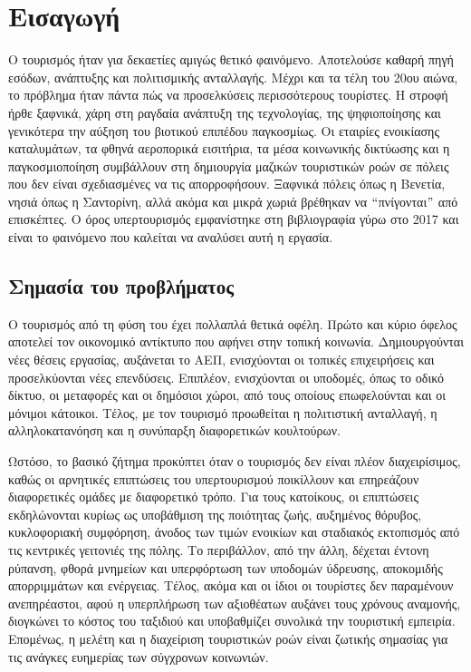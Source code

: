 \chapter{Εισαγωγή}

Ο τουρισμός ήταν για δεκαετίες αμιγώς θετικό φαινόμενο. Αποτελούσε
καθαρή πηγή εσόδων, ανάπτυξης και πολιτισμικής ανταλλαγής. Μέχρι
και τα τέλη του 20ου αιώνα, το πρόβλημα ήταν πάντα πώς να
προσελκύσεις περισσότερους τουρίστες. Η στροφή ήρθε ξαφνικά, χάρη
στη ραγδαία ανάπτυξη της τεχνολογίας, της ψηφιοποίησης και
γενικότερα την αύξηση του βιοτικού επιπέδου παγκοσμίως. Οι
εταιρίες ενοικίασης καταλυμάτων, τα φθηνά αεροπορικά εισιτήρια,
τα μέσα κοινωνικής δικτύωσης και η παγκοσμιοποίηση συμβάλλουν στη
δημιουργία μαζικών τουριστικών ροών σε πόλεις που δεν είναι
σχεδιασμένες να τις απορροφήσουν. Ξαφνικά πόλεις όπως η Βενετία,
νησιά όπως η Σαντορίνη, αλλά ακόμα και μικρά χωριά βρέθηκαν να
$``$πνίγονται$"$ από επισκέπτες. Ο όρος υπερτουρισμός
 εμφανίστηκε στη βιβλιογραφία γύρω στο 2017
και είναι το φαινόμενο που καλείται να αναλύσει αυτή η εργασία.

\section{Σημασία του προβλήματος}

Ο τουρισμός από τη φύση του έχει πολλαπλά θετικά οφέλη. Πρώτο και
κύριο όφελος αποτελεί τον οικονομικό αντίκτυπο που αφήνει στην
τοπική κοινωνία. Δημιουργούνται νέες θέσεις εργασίας, αυξάνεται το
ΑΕΠ, ενισχύονται οι τοπικές επιχειρήσεις και προσελκύονται νέες
επενδύσεις. Επιπλέον, ενισχύονται οι υποδομές, όπως το οδικό δίκτυο,
οι μεταφορές και οι δημόσιοι χώροι, από τους οποίους επωφελούνται
και οι μόνιμοι κάτοικοι. Τέλος, με τον τουρισμό προωθείται η
πολιτιστική ανταλλαγή, η αλληλοκατανόηση και η συνύπαρξη
διαφορετικών κουλτούρων.

Ωστόσο, το βασικό ζήτημα προκύπτει όταν ο τουρισμός δεν είναι πλέον
διαχειρίσιμος, καθώς οι αρνητικές επιπτώσεις του υπερτουρισμού
ποικίλλουν και επηρεάζουν διαφορετικές ομάδες με διαφορετικό τρόπο.
Για τους κατοίκους, οι επιπτώσεις εκδηλώνονται κυρίως ως υποβάθμιση
της ποιότητας ζωής, αυξημένος θόρυβος, κυκλοφοριακή συμφόρηση, άνοδος
των τιμών ενοικίων και σταδιακός εκτοπισμός από τις κεντρικές γειτονιές
της πόλης. Το περιβάλλον, από την άλλη, δέχεται έντονη ρύπανση, φθορά
μνημείων και υπερφόρτωση των υποδομών ύδρευσης, αποκομιδής απορριμμάτων
και ενέργειας. Τέλος, ακόμα και οι ίδιοι οι τουρίστες δεν παραμένουν
ανεπηρέαστοι, αφού η υπερπλήρωση των αξιοθέατων αυξάνει τους χρόνους
αναμονής, διογκώνει το κόστος του ταξιδιού και υποβαθμίζει συνολικά
την τουριστική εμπειρία.
Επομένως, η μελέτη και η διαχείριση τουριστικών ροών είναι ζωτικής
σημασίας για τις ανάγκες ευημερίας των σύγχρονων κοινωνιών.

